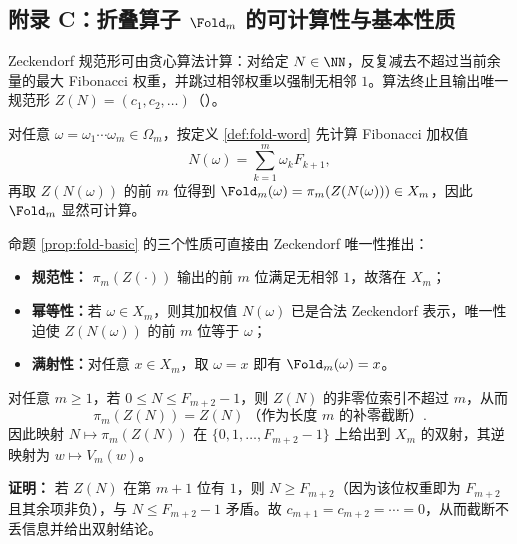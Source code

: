 \subsection{附录 C：折叠算子 \texorpdfstring{$\Fold_m$}{Fold\_m} 的可计算性与基本性质}

Zeckendorf 规范形可由贪心算法计算：对给定 $N\in\NN$，反复减去不超过当前余量的最大 Fibonacci 权重，并跳过相邻权重以强制无相邻 $1$。算法终止且输出唯一规范形 $Z(N)=(c_1,c_2,\dots)$（\cite{Zeckendorf1972}）。

对任意 $\omega=\omega_1\cdots\omega_m\in\Omega_m$，按定义 \ref{def:fold-word} 先计算 Fibonacci 加权值
\[
N(\omega)=\sum_{k=1}^m \omega_k F_{k+1},
\]
再取 $Z(N(\omega))$ 的前 $m$ 位得到 $\Fold_m(\omega)=\pi_m(Z(N(\omega)))\in X_m$，因此 $\Fold_m$ 显然可计算。

命题 \ref{prop:fold-basic} 的三个性质可直接由 Zeckendorf 唯一性推出：
\begin{itemize}
  \item \textbf{规范性：} $\pi_m(Z(\cdot))$ 输出的前 $m$ 位满足无相邻 $1$，故落在 $X_m$；
  \item \textbf{幂等性：}若 $\omega\in X_m$，则其加权值 $N(\omega)$ 已是合法 Zeckendorf 表示，唯一性迫使 $Z(N(\omega))$ 的前 $m$ 位等于 $\omega$；
  \item \textbf{满射性：}对任意 $x\in X_m$，取 $\omega=x$ 即有 $\Fold_m(\omega)=x$。
\end{itemize}

\begin{lemma}\label{lem:zeckendorf-range-bijection}
对任意 $m\ge 1$，若 $0\le N\le F_{m+2}-1$，则 $Z(N)$ 的非零位索引不超过 $m$，从而
\[
\pi_m(Z(N))=Z(N)\ \text{（作为长度 }m\text{ 的补零截断）}.
\]
因此映射 $N\mapsto \pi_m(Z(N))$ 在 $\{0,1,\dots,F_{m+2}-1\}$ 上给出到 $X_m$ 的双射，其逆映射为 $w\mapsto V_m(w)$。
\end{lemma}

\textbf{证明：}
若 $Z(N)$ 在第 $m+1$ 位有 $1$，则 $N\ge F_{m+2}$（因为该位权重即为 $F_{m+2}$ 且其余项非负），与 $N\le F_{m+2}-1$ 矛盾。故 $c_{m+1}=c_{m+2}=\cdots=0$，从而截断不丢信息并给出双射结论。

